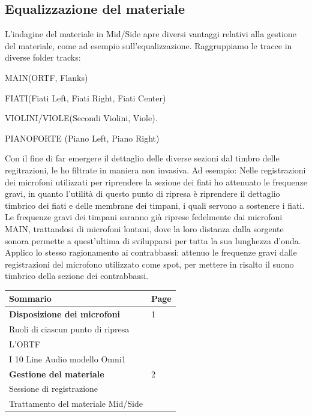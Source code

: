 \subsection*{Equalizzazione del materiale}
L'indagine del materiale in Mid/Side apre diversi vantaggi relativi alla gestione del materiale, come ad esempio sull'equalizzazione. Raggruppiamo le tracce in diverse folder tracks:
\begin{compactitem} 
	\item MAIN(ORTF, Flanks)
	\item FIATI(Fiati Left, Fiati Right, Fiati Center)
	\item VIOLINI/VIOLE(Secondi Violini, Viole).
	\item PIANOFORTE (Piano Left, Piano Right)
	\end{compactitem}
Con il fine di far emergere il dettaglio delle diverse sezioni dal timbro delle regitrazioni, le ho filtrate  in maniera non invasiva.
Ad esempio: Nelle registrazioni dei microfoni utilizzati per riprendere la sezione dei fiati ho attenuato le frequenze gravi, in quanto l'utilità di questo punto di ripresa è riprendere il dettaglio timbrico dei fiati e delle membrane dei timpani, i quali servono a sostenere i fiati. Le frequenze gravi dei timpani saranno già riprese fedelmente dai microfoni MAIN, trattandosi di microfoni lontani, dove la loro distanza dalla sorgente sonora permette a quest'ultima di svilupparsi per tutta la sua lunghezza d'onda.
Applico lo stesso ragionamento ai contrabbassi: attenuo le frequenze gravi dalle registrazioni del microfono utilizzato come spot, per mettere in risalto il suono timbrico della sezione dei contrabbassi.


\vfill\null

\newpage %

\begin{table}[htp]
\begin{tabular}{ll}
\textbf{Sommario} & \textbf{Page} \\
\hline
\textbf{Disposizione dei microfoni} & 1 \\
Ruoli di ciascun punto di ripresa & \\
L'ORTF & \\
I 10 Line Audio modello Omni1 & \\
\hline
\textbf{Gestione del materiale} & 2 \\
Sessione di registrazione & \\
Trattamento del materiale Mid/Side & \\

\end{tabular}
\end{table}

